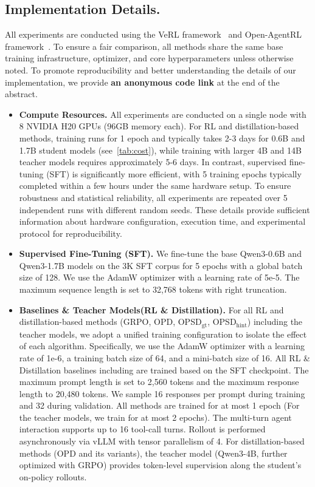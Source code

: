 \subsection{Implementation Details.}
\label{app:implentation_details}

All experiments are conducted using the VeRL framework~\citep{verl} and Open-AgentRL framework~\citep{demy}. To ensure a fair comparison, all methods share the same base training infrastructure, optimizer, and core hyperparameters unless otherwise noted.
To promote reproducibility and better understanding the details of our implementation, we provide \textbf{an anonymous code link} at the end of the abstract.


\begin{itemize}

    \item  \textbf{Compute Resources.}
All experiments are conducted on a single node with 8 NVIDIA H20 GPUs (96GB memory each). For RL and distillation-based methods, training runs for 1 epoch and typically takes 2-3 days for 0.6B and 1.7B student models (see~\cref{tab:cost}), while training with larger 4B and 14B teacher models requires approximately 5-6 days. 
In contrast, supervised fine-tuning (SFT) is significantly more efficient, with 5 training epochs typically completed within a few hours under the same hardware setup. 
To ensure robustness and statistical reliability, all experiments are repeated over 5 independent runs with different random seeds. These details provide sufficient information about hardware configuration, execution time, and experimental protocol for reproducibility.

    \item  \textbf{Supervised Fine-Tuning (SFT).}
We fine-tune the base Qwen3-0.6B and Qwen3-1.7B models on the 3K SFT corpus for 5 epochs with a global batch size of 128. We use the AdamW optimizer with a learning rate of 5e-5. The maximum sequence length is set to 32,768 tokens with right truncation.

    \item  \textbf{Baselines \& Teacher Models(RL \& Distillation).}
For all RL and distillation-based methods (GRPO, OPD, OPSD$_{\mathrm{gt}}$, OPSD$_{\mathrm{hint}}$) including the teacher models, we adopt a unified training configuration to isolate the effect of each algorithm. Specifically, we use the AdamW optimizer with a learning rate of 1e-6, a training batch size of 64, and a mini-batch size of 16. All RL \& Distillation baselines including \ourmodel are trained based on the SFT checkpoint. The maximum prompt length is set to 2,560 tokens and the maximum response length to 20,480 tokens. We sample 16 responses per prompt during training and 32 during validation. All methods are trained for at most 1 epoch (For the teacher models, we train for at most 2 epochs). The multi-turn agent interaction supports up to 16 tool-call turns. Rollout is performed asynchronously via vLLM with tensor parallelism of 4. For distillation-based methods (OPD and its variants), the teacher model (Qwen3-4B, further optimized with GRPO) provides token-level supervision along the student's on-policy rollouts.


\end{itemize}
